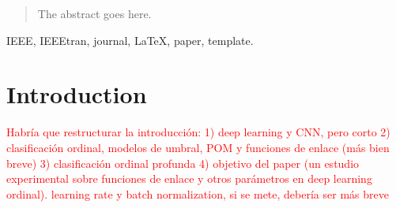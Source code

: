 \documentclass[journal]{IEEEtran}
\begin{document}
	
	
	
	
	
	
	
	
	
	
	\maketitle
	
	\begin{abstract}
		The abstract goes here.
	\end{abstract}
	
	\begin{IEEEkeywords}
		IEEE, IEEEtran, journal, \LaTeX, paper, template.
	\end{IEEEkeywords}
	
	
	
	
	
	
	\IEEEpeerreviewmaketitle
	
	
	
	\section{Introduction}
	\label{sect:introduction}
	\textcolor{red}{Habría que restructurar la introducción: 1) deep learning y CNN, pero corto 2) clasificación ordinal, modelos de umbral, POM y funciones de enlace (más bien breve) 3) clasificación ordinal profunda 4) objetivo del paper (un estudio experimental sobre funciones de enlace y otros parámetros en deep learning ordinal). learning rate y batch normalization, si se mete, debería ser más breve}
	
\end{document}
